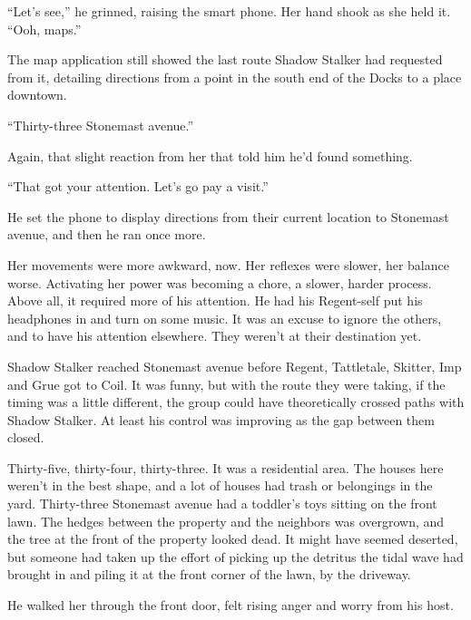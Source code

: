 ``Let's see,'' he grinned, raising the smart phone.  Her hand shook as she held it.  ``Ooh, maps.''



The map application still showed the last route Shadow Stalker had requested from it, detailing directions from a point in the south end of the Docks to a place downtown.



``Thirty-three Stonemast avenue.''



Again, that slight reaction from her that told him he'd found something.



``That got your attention.  Let's go pay a visit.''



He set the phone to display directions from their current location to Stonemast avenue, and then he ran once more.



Her movements were more awkward, now.  Her reflexes were slower, her balance worse.  Activating her power was becoming a chore, a slower, harder process.  Above all, it required more of his attention.  He had his Regent-self put his headphones in and turn on some music.  It was an excuse to ignore the others, and to have his attention elsewhere.  They weren't at their destination yet.



Shadow Stalker reached Stonemast avenue before Regent, Tattletale, Skitter, Imp and Grue got to Coil.  It was funny, but with the route they were taking, if the timing was a little different, the group could have theoretically crossed paths with Shadow Stalker.  At least his control was improving as the gap between them closed.



Thirty-five, thirty-four, thirty-three.  It was a residential area.  The houses here weren't in the best shape, and a lot of houses had trash or belongings in the yard.  Thirty-three Stonemast avenue had a toddler's toys sitting on the front lawn.  The hedges between the property and the neighbors was overgrown, and the tree at the front of the property looked dead.  It might have seemed deserted, but someone had taken up the effort of picking up the detritus the tidal wave had brought in and piling it at the front corner of the lawn, by the driveway.



He walked her through the front door, felt rising anger and worry from his host.



